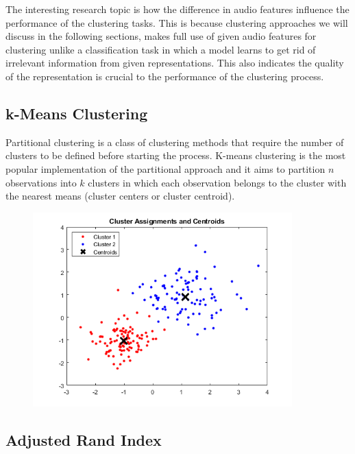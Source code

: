  The interesting research topic is how the difference in audio features influence the performance of the clustering tasks. This is because clustering approaches we will discuss in the following sections, makes full use of given audio features for clustering unlike a classification task in which a model learns to get rid of irrelevant information from given representations. This also indicates the quality of the representation is crucial to the performance of the clustering process. %
 
 
\subsection{k-Means Clustering}
Partitional clustering is a class of clustering methods that require the number of clusters to be defined before starting the process. K-means clustering is the most popular implementation of the partitional approach and it aims to partition $n$ observations into $k$ clusters in which each observation belongs to the cluster with the nearest means (cluster centers or cluster centroid).

\begin{figure}[htb]
	\centering
	\includegraphics[width=10cm]{Figures/kmeans_diagram.png}
	\caption{}
	\label{kmeans-diagram}
\end{figure}

\subsection{Adjusted Rand Index}



\newpage


